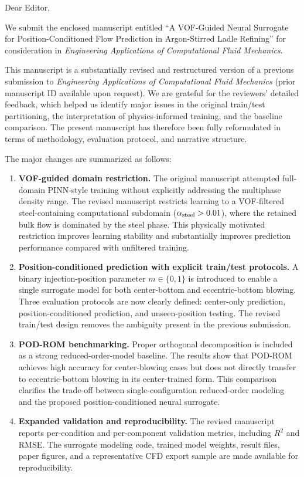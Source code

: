 \documentclass{article}
\begin{document}
\date{}

\noindent Dear Editor,

\vspace{1em}

We submit the enclosed manuscript entitled ``A VOF-Guided Neural Surrogate for Position-Conditioned Flow Prediction in Argon-Stirred Ladle Refining'' for consideration in \textit{Engineering Applications of Computational Fluid Mechanics}.

This manuscript is a substantially revised and restructured version of a previous submission to \textit{Engineering Applications of Computational Fluid Mechanics} (prior manuscript ID available upon request). We are grateful for the reviewers' detailed feedback, which helped us identify major issues in the original train/test partitioning, the interpretation of physics-informed training, and the baseline comparison. The present manuscript has therefore been fully reformulated in terms of methodology, evaluation protocol, and narrative structure.

The major changes are summarized as follows:

\begin{enumerate}
\item \textbf{VOF-guided domain restriction.} The original manuscript attempted full-domain PINN-style training without explicitly addressing the multiphase density range. The revised manuscript restricts learning to a VOF-filtered steel-containing computational subdomain ($\alpha_{\rm steel}>0.01$), where the retained bulk flow is dominated by the steel phase. This physically motivated restriction improves learning stability and substantially improves prediction performance compared with unfiltered training.

\item \textbf{Position-conditioned prediction with explicit train/test protocols.} A binary injection-position parameter $m\in\{0,1\}$ is introduced to enable a single surrogate model for both center-bottom and eccentric-bottom blowing. Three evaluation protocols are now clearly defined: center-only prediction, position-conditioned prediction, and unseen-position testing. The revised train/test design removes the ambiguity present in the previous submission.

\item \textbf{POD-ROM benchmarking.} Proper orthogonal decomposition is included as a strong reduced-order-model baseline. The results show that POD-ROM achieves high accuracy for center-blowing cases but does not directly transfer to eccentric-bottom blowing in its center-trained form. This comparison clarifies the trade-off between single-configuration reduced-order modeling and the proposed position-conditioned neural surrogate.

\item \textbf{Expanded validation and reproducibility.} The revised manuscript reports per-condition and per-component validation metrics, including $R^{2}$ and RMSE. The surrogate modeling code, trained model weights, result files, paper figures, and a representative CFD export sample are made available for reproducibility.
\end{enumerate}
\end{document}

